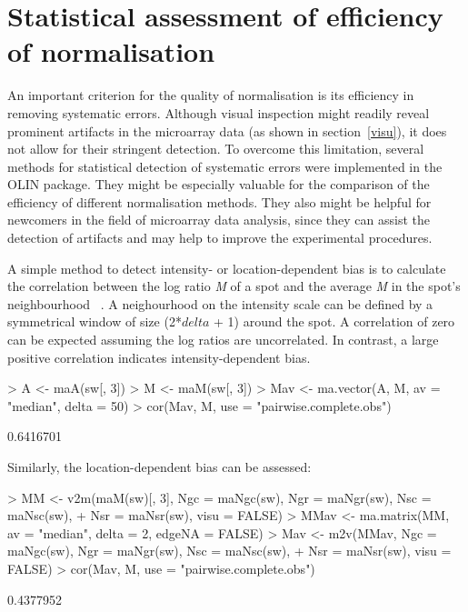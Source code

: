 \documentclass[a4paper,11pt]{article}
\begin{document}
\section{Statistical assessment of efficiency of normalisation}
\label{stats}
An important criterion for the quality of normalisation is its efficiency in 
removing systematic errors. Although visual inspection might readily reveal prominent
artifacts in the microarray data (as shown in section~\ref{visu}), it does not allow for their stringent 
detection. To overcome this limitation, several methods for statistical detection of 
systematic errors were implemented in the OLIN package. They might be especially valuable
for the comparison of the efficiency of different normalisation methods. They also might 
be helpful for newcomers in the field of microarray data analysis, since they can assist the
detection of artifacts and may help to improve the experimental procedures.

A simple method to detect intensity- or location-dependent  bias is to calculate the 
correlation between the log ratio \emph{M} of a spot and the average \emph{M} in the spot's 
neighbourhood ~\cite{jo}. A neighourhood on the intensity scale can be defined by a symmetrical
window of size (2*$delta$ + 1) around the spot. A correlation of zero can be expected assuming
the log ratios are uncorrelated. In contrast, a large positive correlation indicates intensity-dependent
 bias.

\begin{Schunk}
\begin{Sinput}
> A <- maA(sw[, 3])
> M <- maM(sw[, 3])
> Mav <- ma.vector(A, M, av = "median", delta = 50)
> cor(Mav, M, use = "pairwise.complete.obs")
\end{Sinput}
\begin{Soutput}
          [,1]
[1,] 0.6416701
\end{Soutput}
\end{Schunk}

Similarly, the location-dependent bias can be assessed: 

\begin{Schunk}
\begin{Sinput}
> MM <- v2m(maM(sw)[, 3], Ngc = maNgc(sw), Ngr = maNgr(sw), Nsc = maNsc(sw), 
+     Nsr = maNsr(sw), visu = FALSE)
> MMav <- ma.matrix(MM, av = "median", delta = 2, edgeNA = FALSE)
> Mav <- m2v(MMav, Ngc = maNgc(sw), Ngr = maNgr(sw), Nsc = maNsc(sw), 
+     Nsr = maNsr(sw), visu = FALSE)
> cor(Mav, M, use = "pairwise.complete.obs")
\end{Sinput}
\begin{Soutput}
          [,1]
[1,] 0.4377952
\end{Soutput}
\end{Schunk}
\end{document}
